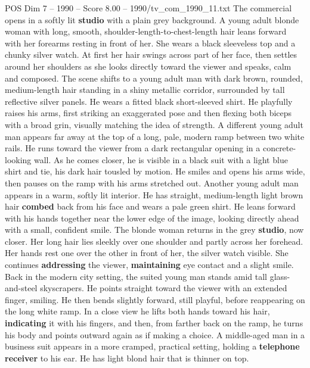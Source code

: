 \begin{textsample}{POS Dim 7 – 1990 – Score 8.00 – 1990/tv\_com\_1990\_11.txt}  \label{ex:f7_pos_062}
The commercial opens in a softly lit \textbf{studio} with a plain grey background.
A young adult blonde woman with long, smooth, shoulder-length-to-chest-length hair leans forward with her forearms resting in front of her.
She wears a black sleeveless top and a chunky silver watch.
At first her hair swings across part of her face, then settles around her shoulders as she looks directly toward the viewer and speaks, calm and composed.
The scene shifts to a young adult man with dark brown, rounded, medium-length hair standing in a shiny metallic corridor, surrounded by tall reflective silver panels.
He wears a fitted black short-sleeved shirt.
He playfully raises his arms, first striking an exaggerated pose and then flexing both biceps with a broad grin, visually matching the idea of strength.
A different young adult man appears far away at the top of a long, pale, modern ramp between two white rails.
He runs toward the viewer from a dark rectangular opening in a concrete-looking wall.
As he comes closer, he is visible in a black suit with a light blue shirt and tie, his dark hair tousled by motion.
He smiles and opens his arms wide, then pauses on the ramp with his arms stretched out.
Another young adult man appears in a warm, softly lit interior.
He has straight, medium-length light brown hair \textbf{combed} back from his face and wears a pale green shirt.
He leans forward with his hands together near the lower edge of the image, looking directly ahead with a small, confident smile.
The blonde woman returns in the grey \textbf{studio}, now closer.
Her long hair lies sleekly over one shoulder and partly across her forehead.
Her hands rest one over the other in front of her, the silver watch visible.
She continues \textbf{addressing} the viewer, \textbf{maintaining} eye contact and a slight smile.
Back in the modern city setting, the suited young man stands amid tall glass-and-steel skyscrapers.
He points straight toward the viewer with an extended finger, smiling.
He then bends slightly forward, still playful, before reappearing on the long white ramp.
In a close view he lifts both hands toward his hair, \textbf{indicating} it with his fingers, and then, from farther back on the ramp, he turns his body and points outward again as if making a choice.
A middle-aged man in a business suit appears in a more cramped, practical setting, holding a \textbf{telephone} \textbf{receiver} to his ear.
He has light blond hair that is thinner on top.

\end{textsample}

